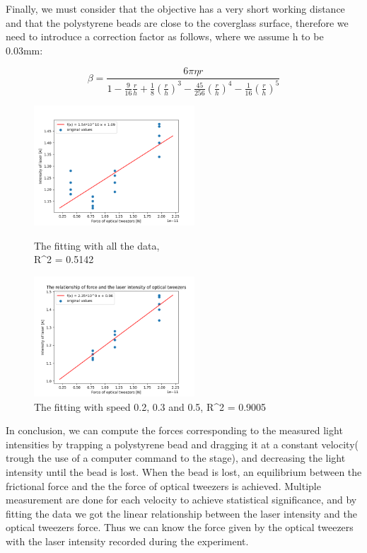 \documentclass[a4paper,english,12pt,bibliography=totoc]{scrreprt}
\begin{document}
Finally, we must consider that the objective has a very short working distance and that the polystyrene beads are close to the coverglass surface, therefore we need to introduce a correction factor as follows, where we assume h to be 0.03mm:

\[
\beta = \frac{6 \pi \eta r}{1-\frac{9}{16} \frac{r}{h} + \frac{1}{8} {(\frac{r}{h})}^3 - \frac{45}{256} {(\frac{r}{h})}^4 - \frac{1}{16}{(\frac{r}{h})}^5}
\]

\begin{figure}[htbp]
\centering
\begin{minipage}[t]{0.48\textwidth}
\centering
\includegraphics[width=6cm]{Images/fitting1.png}
\caption{The fitting with all the data, \\R^2 = 0.5142}
\end{minipage}
\begin{minipage}[t]{0.48\textwidth}
\centering
\includegraphics[width=6cm]{Images/fitting2.png}
\caption{The fitting with speed 0.2, 0.3 and 0.5, R^2 = 0.9005}
\end{minipage}
\end{figure}

In conclusion, we can compute the forces corresponding to the measured light intensities by trapping a polystyrene bead and dragging it at a constant velocity( trough the use of a computer command to the stage), and decreasing the light intensity until the bead is lost.
When the bead is lost, an equilibrium between the frictional force and 
the the force of optical tweezers is achieved. Multiple measurement are done for each velocity to achieve statistical significance, and by fitting the data we got the linear relationship between the laser intensity and the optical tweezers force. Thus we can know the force given by the optical tweezers with the laser intensity recorded during the experiment.\\
\end{document}
